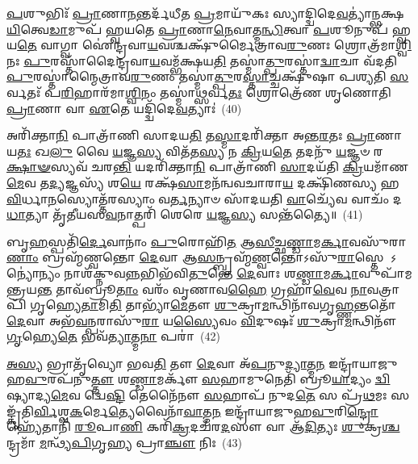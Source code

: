 \-\ul{𑌪}\-𑌶𑍁𑌭𑌿𑌃᳴ \ul{𑌪𑍍𑌰𑌾}\-𑌣𑌾\-\ul{𑌨}\-𑌨𑍍𑌤𑌰𑍍𑌦᳴𑌧𑍀𑌤 \ul{𑌪𑍍𑌰}\-𑌮𑌾𑌯𑍁᳴𑌕𑌃 𑌸𑍍𑌯𑌾𑌦𑍍𑌦𑍍𑌵𑌿𑌦𑍇\-\ul{𑌵}\-𑌤𑍍𑌯𑌾॑𑌨𑍍𑌭𑌕𑍍𑌷\-\ul{𑌯𑌿}\-𑌤𑍍𑌵𑍇\-\ul{𑌡𑌾}\-𑌮𑍁𑌪᳴ 𑌹𑍍𑌵𑌯𑌤𑍇 \ul{𑌪𑍍𑌰𑌾}\-𑌣𑌾\-\ul{𑌨𑍇}\-𑌵𑌾𑌤𑍍𑌮\-\ul{𑌨𑍍𑌧𑌿}\-𑌤𑍍𑌵𑌾 \ul{𑌪}\-𑌶𑍂𑌨𑍁𑌪᳴ 𑌹𑍍𑌵𑌯\-\ul{𑌤𑍇} 𑌵𑌾𑌗𑍍𑌵𑌾 𑌐॑𑌨𑍍𑌦𑍍𑌰𑌵𑌾\-\ul{𑌯}\-𑌵𑌶𑍍𑌚𑌕𑍍𑌷𑍁᳴𑌰𑍍𑌮𑍈𑌤𑍍𑌰𑌾𑌵\-\ul{𑌰𑍁}\-𑌣𑌃 𑌶𑍍𑌰𑍋𑌤𑍍𑌰᳴𑌮𑌾\-\ul{𑌶𑍍𑌵𑌿}\-𑌨𑌃 \ul{𑌪𑍁}\-𑌰𑌸𑍍𑌤𑌾᳴𑌦𑍈𑌨𑍍𑌦𑍍𑌰𑌵𑌾\-\ul{𑌯}\-𑌵𑌮𑍍𑌭᳴𑌕𑍍𑌷𑌯\-\ul{𑌤𑌿} 𑌤𑌸𑍍𑌮𑌾॑\-\ul{𑌤𑍍𑌪𑍁}\-𑌰𑌸𑍍𑌤𑌾॑\-\ul{𑌦𑍍𑌵𑌾}\-𑌚𑌾 𑌵᳴𑌦𑌤𑌿 \ul{𑌪𑍁}\-𑌰𑌸𑍍𑌤𑌾॑𑌨𑍍𑌮𑍈𑌤𑍍𑌰𑌾𑌵\-\ul{𑌰𑍁}\-𑌣𑌂 𑌤𑌸𑍍𑌮𑌾॑\-\ul{𑌤𑍍𑌪𑍁}\-𑌰\-\ul{𑌸𑍍𑌤𑌾}\-𑌚𑍍𑌚𑌕𑍍𑌷𑍁᳴𑌷𑌾 𑌪𑌶𑍍𑌯𑌤𑌿 \ul{𑌸}\-𑌰𑍍𑌵𑌤𑌃᳴ 𑌪\-\ul{𑌰𑌿}\-𑌹𑌾𑌰᳴𑌮𑌾\-\ul{𑌶𑍍𑌵𑌿}\-𑌨𑌂 𑌤𑌸𑍍𑌮𑌾॑\-\ul{𑌥𑍍𑌸}\-𑌰𑍍𑌵\-\ul{𑌤𑌃} 𑌶𑍍𑌰𑍋𑌤𑍍𑌰𑍇᳴𑌣 𑌶𑍃𑌣𑍋𑌤𑌿 \ul{𑌪𑍍𑌰𑌾}\-𑌣𑌾 𑌵𑌾 \ul{𑌏}\-𑌤𑍇 𑌯𑌦𑍍𑌦𑍍𑌵𑌿᳴𑌦𑍇\-\ul{𑌵}\-𑌤𑍍𑌯𑌾𑌃॑~(40)

𑌅𑌰𑌿᳴𑌕𑍍𑌤𑌾\-\ul{𑌨𑌿} 𑌪𑌾𑌤𑍍𑌰𑌾᳴𑌣𑌿 𑌸𑌾𑌦𑌯\-\ul{𑌤𑌿} 𑌤\-\ul{𑌸𑍍𑌮𑌾}\-𑌦𑌰𑌿᳴𑌕𑍍𑌤𑌾 𑌅𑌨𑍍𑌤\-\ul{𑌰}\-𑌤𑌃 \ul{𑌪𑍍𑌰𑌾}\-𑌣𑌾 𑌯\-\ul{𑌤𑌃} 𑌖\-\ul{𑌲𑍁} 𑌵𑍈 \ul{𑌯}\-𑌜𑍍𑌞\-\ul{𑌸𑍍𑌯} 𑌵𑌿𑌤᳴𑌤\-\ul{𑌸𑍍𑌯} 𑌨 \ul{𑌕𑍍𑌰𑌿}\-𑌯\-\ul{𑌤𑍇} 𑌤𑌦𑌨𑍁᳴ \ul{𑌯}\-𑌜𑍍𑌞𑍞 𑌰\-\ul{𑌕𑍍𑌷𑌾}\-\-\ul{𑍟}\-𑌸𑍍𑌯𑌵᳴ 𑌚𑌰\-\ul{𑌨𑍍𑌤𑌿} 𑌯𑌦𑌰𑌿᳴𑌕𑍍𑌤𑌾\-\ul{𑌨𑌿} 𑌪𑌾𑌤𑍍𑌰𑌾᳴𑌣𑌿 \ul{𑌸𑌾}\-𑌦𑌯᳴𑌤𑌿 \ul{𑌕𑍍𑌰𑌿}\-𑌯𑌮𑌾᳴𑌣\-\ul{𑌮𑍇}\-𑌵 𑌤\-\ul{𑌦𑍍𑌯}\-𑌜𑍍𑌞𑌸𑍍𑌯᳴ 𑌶\-\ul{𑌯𑍇} 𑌰𑌕𑍍𑌷᳴\-\ul{𑌸𑌾}\-𑌮𑌨᳴𑌨𑍍𑌵𑌵𑌚𑌾𑌰𑌾\-\ul{𑌯} 𑌦𑌕𑍍𑌷𑌿᳴𑌣𑌸𑍍𑌯 𑌹\-\ul{𑌵𑌿}\-𑌰𑍍𑌧𑌾\-\ul{𑌨}\-𑌸𑍍𑌯𑍋𑌤𑍍𑌤᳴𑌰𑌸𑍍𑌯𑌾𑌂 𑌵\-\ul{𑌰𑍍𑌤}\-𑌨𑍍𑌯𑌾𑍞 𑌸𑌾᳴𑌦𑌯𑌤𑌿 \ul{𑌵𑌾}\-𑌚𑍍𑌯𑍇᳴𑌵 𑌵𑌾𑌚𑌂᳴ 𑌦\-\ul{𑌧𑌾}\-𑌤𑍍𑌯𑌾 𑌤𑍃᳴𑌤𑍀𑌯𑌸\-\ul{𑌵}\-𑌨𑌾𑌤𑍍𑌪𑌰𑌿᳴ 𑌶𑍇𑌰𑍇 \ul{𑌯}\-𑌜𑍍𑌞\-\ul{𑌸𑍍𑌯} 𑌸𑌨𑍍𑌤᳴𑌤𑍍𑌯𑍈॥~(41)

{\anuvakamend[{\-\ul{𑌮}\-\-\ul{𑌨𑍁}\-\-\ul{𑌷𑍍𑌯}\-\-\ul{𑌚}\-𑌰𑌾𑌵𑍁᳴𑌦\-\ul{𑌪𑌾}\-𑌤𑍍𑌰𑌮𑍁᳴\-\ul{𑌪}\-𑌹𑍍𑌵𑌯𑍇᳴𑌤 𑌦𑍍𑌵𑌿𑌦𑍇\-\ul{𑌵}\-𑌤𑍍𑌯𑌾𑌃॑ 𑌷𑌟𑍍𑌚᳴𑌤𑍍𑌵𑌾𑌰𑌿𑍞𑌶𑌚𑍍𑌚}]}%

𑌬𑍃\-\ul{𑌹}\-𑌸𑍍𑌪𑌤𑌿᳴\-\ul{𑌰𑍍𑌦𑍇}\-𑌵𑌾𑌨𑌾𑌂॑ \ul{𑌪𑍁}\-𑌰𑍋𑌹𑌿᳴\-\ul{𑌤} 𑌆\-\ul{𑌸𑍀}\-𑌚𑍍𑌛\-\ul{𑌣𑍍𑌡𑌾}\-𑌮\-\ul{𑌰𑍍𑌕𑌾}\-𑌵𑌸𑍁᳴𑌰𑌾\-\ul{𑌣𑌾𑌂} 𑌬𑍍𑌰𑌹𑍍𑌮᳴𑌣𑍍𑌵𑌨𑍍𑌤𑍋 \ul{𑌦𑍇}\-𑌵𑌾 𑌆\-\ul{𑌸}\-𑌨𑍍𑌬𑍍𑌰𑌹𑍍𑌮᳴\-\ul{𑌣𑍍𑌵}\-𑌨𑍍𑌤𑍋\-𑌽𑌸𑍁᳴\-\ul{𑌰𑌾}\-𑌸𑍍𑌤𑍇 \-𑌽𑌨𑍍𑌯𑍋॑𑌨𑍍𑌯𑌂 𑌨𑌾𑌶᳴𑌕𑍍𑌨𑍁𑌵\-\ul{𑌨𑍍𑌨}\-𑌭𑌿𑌭᳴𑌵𑌿\-\ul{𑌤𑍁}\-𑌨𑍍𑌤𑍇 \ul{𑌦𑍇}\-𑌵𑌾𑌃 𑌶\-\ul{𑌣𑍍𑌡𑌾}\-𑌮\-\ul{𑌰𑍍𑌕𑌾}\-𑌵𑍁𑌪𑌾᳴𑌮𑌨𑍍𑌤𑍍𑌰𑌯\-\ul{𑌨𑍍𑌤} 𑌤𑌾𑌵᳴𑌬𑍍𑌰𑍂\-\ul{𑌤𑌾𑌂} 𑌵𑌰𑌂᳴ 𑌵𑍃𑌣𑌾𑌵\-\ul{𑌹𑍈} 𑌗𑍍𑌰𑌹𑌾᳴\-\ul{𑌵𑍇}\-𑌵 \ul{𑌨𑌾}\-𑌵𑌤𑍍𑌰𑌾𑌪𑌿᳴ 𑌗𑍃𑌹𑍍𑌯𑍇\-\ul{𑌤𑌾}\-𑌮𑌿\-\ul{𑌤𑌿} 𑌤𑌾𑌭𑍍𑌯𑌾᳴\-\ul{𑌮𑍇}\-𑌤𑍗 \ul{𑌶𑍁}\-𑌕𑍍𑌰𑌾\-\ul{𑌮}\-𑌨𑍍𑌥𑌿𑌨𑌾᳴𑌵𑌗𑍃\-\ul{𑌹𑍍𑌣}\-𑌨𑍍𑌤𑌤𑍋᳴ \ul{𑌦𑍇}\-𑌵𑌾 𑌅𑌭᳴\-\ul{𑌵}\-𑌨𑍍𑌪𑌰𑌾𑌸𑍁᳴\-\ul{𑌰𑌾} 𑌯\-\ul{𑌸𑍍𑌯𑍈}\-𑌵𑌂 \ul{𑌵𑌿}\-𑌦𑍁𑌷𑌃᳴ \ul{𑌶𑍁}\-𑌕𑍍𑌰𑌾\-\ul{𑌮}\-𑌨𑍍𑌥𑌿𑌨𑍗᳴ \ul{𑌗𑍃}\-𑌹𑍍𑌯𑍇\-\ul{𑌤𑍇} 𑌭𑌵᳴\-\ul{𑌤𑍍𑌯𑌾}\-𑌤𑍍𑌮\-\ul{𑌨𑌾} 𑌪𑌰𑌾॑~(42)

\-\ul{𑌅}\-\-\ul{𑌸𑍍𑌯} 𑌭𑍍𑌰𑌾𑌤𑍃᳴𑌵𑍍𑌯𑍋 𑌭𑌵\-\ul{𑌤𑌿} 𑌤𑍗 \ul{𑌦𑍇}\-𑌵𑌾 𑌅᳴\-\ul{𑌪}\-𑌨𑍁\-\ul{𑌦𑍍𑌯𑌾}\-𑌤𑍍𑌮\-\ul{𑌨} 𑌇𑌨𑍍𑌦𑍍𑌰𑌾᳴𑌯𑌾𑌜𑍁𑌹\-\ul{𑌵𑍁}\-𑌰𑌪᳴𑌨𑍁\-\ul{𑌤𑍍𑌤𑍗} 𑌶\-\ul{𑌣𑍍𑌡𑌾}\-𑌮𑌰𑍍𑌕𑍗᳴ \ul{𑌸}\-𑌹𑌾𑌮𑍁𑌨𑍇𑌤𑌿᳴ 𑌬𑍍𑌰𑍂\-\ul{𑌯𑌾}\-𑌦𑍍𑌯𑌂 \ul{𑌦𑍍𑌵𑌿}\-𑌷𑍍𑌯𑌾𑌦𑍍𑌯\-\ul{𑌮𑍇}\-𑌵 𑌦𑍍𑌵𑍇\-\ul{𑌷𑍍𑌟𑌿} 𑌤𑍇𑌨𑍈᳴𑌨𑍗 \ul{𑌸}\-𑌹𑌾𑌪᳴ 𑌨𑍁𑌦\-\ul{𑌤𑍇} 𑌸 𑌪𑍍𑌰᳴\-\ul{𑌥}\-𑌮𑌃 𑌸𑌙𑍍𑌕𑍃᳴𑌤𑌿\-\ul{𑌰𑍍𑌵𑌿}\-𑌶𑍍𑌵\-\ul{𑌕}\-𑌰𑍍𑌮𑍇\-\ul{𑌤𑍍𑌯𑍇}\-𑌵𑍈𑌨𑌾᳴\-\ul{𑌵𑌾}\-𑌤𑍍𑌮\-\ul{𑌨} 𑌇𑌨𑍍𑌦𑍍𑌰𑌾᳴𑌯𑌾𑌜𑍁𑌹\-\ul{𑌵𑍁}\-𑌰𑌿\-\ul{𑌨𑍍𑌦𑍍𑌰𑍋} 𑌹𑍍𑌯𑍇᳴𑌤𑌾𑌨𑌿᳴ \ul{𑌰𑍂}\-𑌪𑌾\-\ul{𑌣𑌿} 𑌕𑌰𑌿᳴\-\ul{𑌕𑍍𑌰}\-𑌦𑌚᳴𑌰\-\ul{𑌦}\-𑌸𑍗 𑌵𑌾 𑌆᳴\-\ul{𑌦𑌿}\-𑌤𑍍𑌯𑌃 \ul{𑌶𑍁}\-𑌕𑍍𑌰\-\ul{𑌶𑍍𑌚}\-𑌨𑍍𑌦𑍍𑌰𑌮𑌾᳴ \ul{𑌮}\-𑌨𑍍𑌥𑍍𑌯᳴\-\ul{𑌪𑌿}\-𑌗𑍃\-\ul{𑌹𑍍𑌯} 𑌪𑍍𑌰𑌾\-\ul{𑌞𑍍𑌚𑍗} 𑌨𑌿𑌃~(43)

